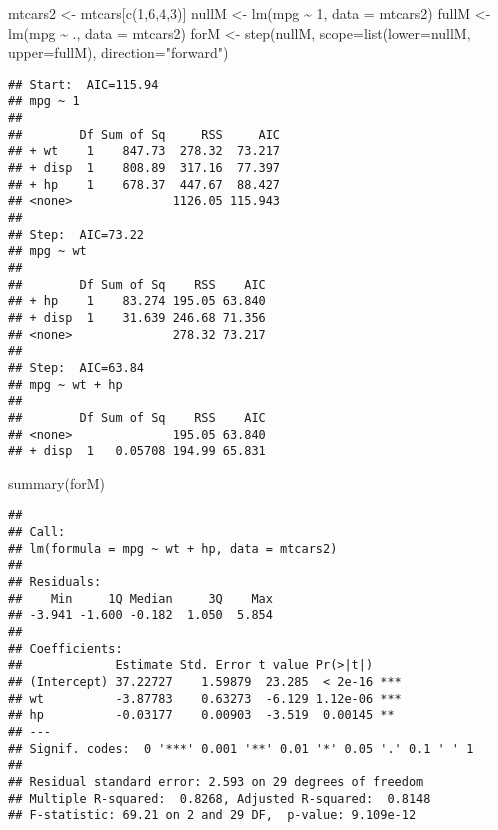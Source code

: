 \documentclass[
]{book}
\newenvironment{Shaded}{\begin{snugshade}}{\end{snugshade}}
\newcommand{\AttributeTok}[1]{\textcolor[rgb]{0.77,0.63,0.00}{#1}}
\newcommand{\DecValTok}[1]{\textcolor[rgb]{0.00,0.00,0.81}{#1}}
\newcommand{\FunctionTok}[1]{\textcolor[rgb]{0.00,0.00,0.00}{#1}}
\newcommand{\NormalTok}[1]{#1}
\newcommand{\OtherTok}[1]{\textcolor[rgb]{0.56,0.35,0.01}{#1}}
\newcommand{\SpecialCharTok}[1]{\textcolor[rgb]{0.00,0.00,0.00}{#1}}
\newcommand{\StringTok}[1]{\textcolor[rgb]{0.31,0.60,0.02}{#1}}
\begin{document}
\begin{Shaded}
\begin{Highlighting}[]
\NormalTok{mtcars2 }\OtherTok{\textless{}{-}}\NormalTok{ mtcars[}\FunctionTok{c}\NormalTok{(}\DecValTok{1}\NormalTok{,}\DecValTok{6}\NormalTok{,}\DecValTok{4}\NormalTok{,}\DecValTok{3}\NormalTok{)]}
\NormalTok{nullM }\OtherTok{\textless{}{-}} \FunctionTok{lm}\NormalTok{(mpg }\SpecialCharTok{\textasciitilde{}} \DecValTok{1}\NormalTok{, }\AttributeTok{data =}\NormalTok{ mtcars2)}
\NormalTok{fullM }\OtherTok{\textless{}{-}} \FunctionTok{lm}\NormalTok{(mpg }\SpecialCharTok{\textasciitilde{}}\NormalTok{ ., }\AttributeTok{data =}\NormalTok{ mtcars2)}
\NormalTok{forM }\OtherTok{\textless{}{-}} \FunctionTok{step}\NormalTok{(nullM, }\AttributeTok{scope=}\FunctionTok{list}\NormalTok{(}\AttributeTok{lower=}\NormalTok{nullM, }\AttributeTok{upper=}\NormalTok{fullM), }\AttributeTok{direction=}\StringTok{"forward"}\NormalTok{)}
\end{Highlighting}
\end{Shaded}

\begin{verbatim}
## Start:  AIC=115.94
## mpg ~ 1
## 
##        Df Sum of Sq     RSS     AIC
## + wt    1    847.73  278.32  73.217
## + disp  1    808.89  317.16  77.397
## + hp    1    678.37  447.67  88.427
## <none>              1126.05 115.943
## 
## Step:  AIC=73.22
## mpg ~ wt
## 
##        Df Sum of Sq    RSS    AIC
## + hp    1    83.274 195.05 63.840
## + disp  1    31.639 246.68 71.356
## <none>              278.32 73.217
## 
## Step:  AIC=63.84
## mpg ~ wt + hp
## 
##        Df Sum of Sq    RSS    AIC
## <none>              195.05 63.840
## + disp  1   0.05708 194.99 65.831
\end{verbatim}

\begin{Shaded}
\begin{Highlighting}[]
\FunctionTok{summary}\NormalTok{(forM)}
\end{Highlighting}
\end{Shaded}

\begin{verbatim}
## 
## Call:
## lm(formula = mpg ~ wt + hp, data = mtcars2)
## 
## Residuals:
##    Min     1Q Median     3Q    Max 
## -3.941 -1.600 -0.182  1.050  5.854 
## 
## Coefficients:
##             Estimate Std. Error t value Pr(>|t|)    
## (Intercept) 37.22727    1.59879  23.285  < 2e-16 ***
## wt          -3.87783    0.63273  -6.129 1.12e-06 ***
## hp          -0.03177    0.00903  -3.519  0.00145 ** 
## ---
## Signif. codes:  0 '***' 0.001 '**' 0.01 '*' 0.05 '.' 0.1 ' ' 1
## 
## Residual standard error: 2.593 on 29 degrees of freedom
## Multiple R-squared:  0.8268, Adjusted R-squared:  0.8148 
## F-statistic: 69.21 on 2 and 29 DF,  p-value: 9.109e-12
\end{verbatim}
\end{document}
